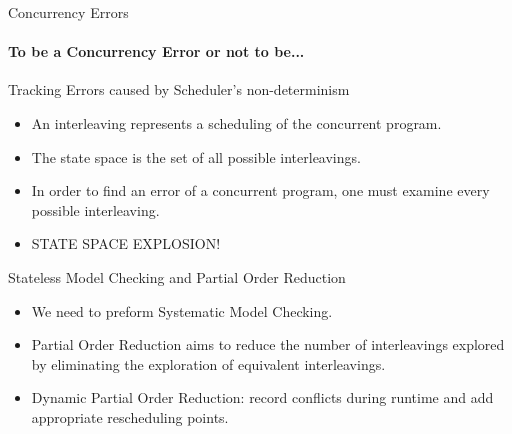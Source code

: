 \documentclass[9pt]{beamer}
\newcommand{\trace}[2]{
\begin{figure}[H]
\centering
\texttt{[image: \#1]}
\caption{#2}
\label{#2}
\end{figure}
}
\newcommand{\Code}[2]{
  \begin{minipage}{\linewidth}
  
  \label{#2}
  \end{minipage}
 }
\begin{document}
\begin{frame}{Concurrency Errors}
\framesubtitle{ To be a Concurrency Error or not to be...}

\Code{../code/zero.c}{Example of non-concurrency error}

\Code{../code/zeroconc.c}{Example of concurrency error}

\end{frame}


\iffalse
\begin{frame}{Testing, Model Checking, and Verification}
\begin{itemize}
\item Testing: For some given inputs check whether the output is correct.
\item Verification: Prove formally that the output is correct.
\item Model Checking: Explore all the possible states the system can be.

\end{itemize}

\trace{../img/testmodver.png}{Comparing Testing, Model Checking and Verification}
    
\end{frame}
\fi

\begin{frame}{Tracking Errors caused by Scheduler's non-determinism}

\begin{itemize}[<+->]
    \item An interleaving represents a scheduling of the concurrent program.
    \item The state space is the set of all possible interleavings.
    \item In order to find an error of a concurrent program, one must examine every possible interleaving.
    \item STATE SPACE EXPLOSION!
\end{itemize}
    

\end{frame}

\begin{frame} {Stateless Model Checking and Partial Order Reduction}

\begin{itemize}[<+->]

\item We need to preform Systematic Model Checking.
\item Partial Order Reduction aims to reduce the number of interleavings explored by eliminating the exploration of equivalent
interleavings.
\item Dynamic Partial Order Reduction: record conflicts during runtime and add appropriate rescheduling points.

\end{itemize}

\end{frame}
\end{document}

